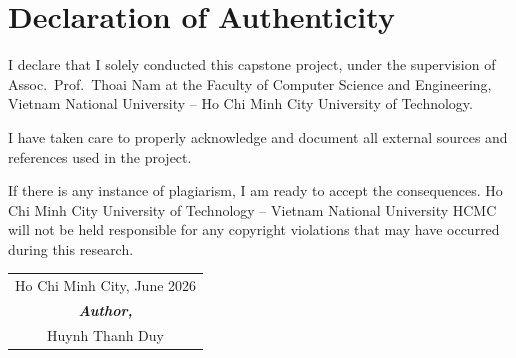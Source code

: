 \chapter*{Declaration of Authenticity}

I declare that I solely conducted this capstone project, under the supervision of Assoc.\ Prof.\ Thoai Nam at the Faculty of Computer Science and Engineering, Vietnam National University -- Ho Chi Minh City University of Technology.
 
\noindent I have taken care to properly acknowledge and document all external sources and references used in the project.

\noindent If there is any instance of plagiarism, I am ready to accept the consequences. Ho Chi Minh City University of Technology -- Vietnam National University HCMC will not be held responsible for any copyright violations that may have occurred during this research.

\vspace{2cm}

\begin{flushright}
\begin{tabular}{c}
    Ho Chi Minh City, June 2026 \\
    \textit{\textbf{Author,}} \\[0.3cm]
    Huynh Thanh Duy
\end{tabular}
\end{flushright}